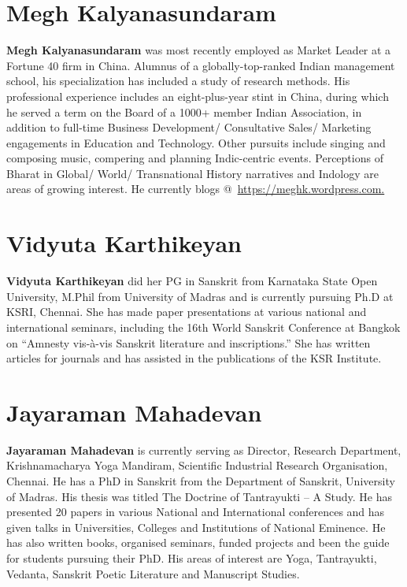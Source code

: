 \section*{Megh Kalyanasundaram}

\textbf{Megh Kalyanasundaram} was most recently employed as Market Leader at a Fortune 40 firm in China. Alumnus of a globally-top-ranked Indian management school, his specialization has included a study of research methods. His professional experience includes an eight-plus-year stint in China, during which he served a term on the Board of a 1000+ member Indian Association, in addition to full-time Business Development/ Consultative Sales/ Marketing engagements in Education and Technology. Other pursuits include singing and composing music, compering and planning Indic-centric events. Perceptions of Bharat in Global/ World/ Transnational History narratives and Indology are areas of growing interest. He currently blogs @ \url{https://meghk.wordpress.com.}

\section*{Vidyuta Karthikeyan}

\vskip -2pt

\textbf{Vidyuta Karthikeyan} did her PG in Sanskrit from Karnataka State Open University, M.Phil from University of Madras and is currently pursuing Ph.D at KSRI, Chennai. She has made paper presentations at various national and international seminars, including the 16th World Sanskrit Conference at Bangkok on “Amnesty vis-à-vis Sanskrit literature and inscriptions.” She has written articles for journals and has assisted in the publications of the KSR Institute.

\section*{Jayaraman Mahadevan}

\textbf{Jayaraman Mahadevan} is currently serving as Director, Research Department, Krishnamacharya Yoga Mandiram, Scientific Industrial Research Organisation, Chennai. He has a PhD in Sanskrit from the Department of Sanskrit, University of Madras. His thesis was titled The Doctrine of Tantrayukti – A Study. He has presented 20 papers in various National and International conferences and has given talks in Universities, Colleges and Institutions of National Eminence. He has also written books, organised seminars, funded projects and been the guide for students pursuing their PhD. His areas of interest are Yoga, Tantrayukti, Vedanta, Sanskrit Poetic Literature and Manuscript Studies.

